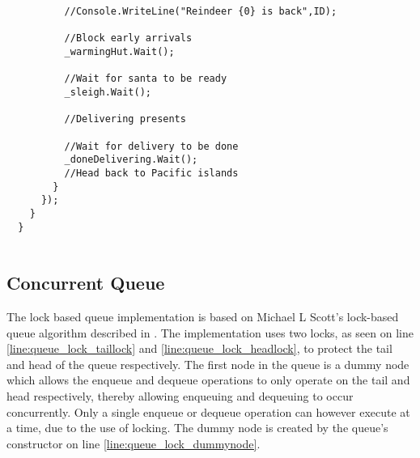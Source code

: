 \begin{lstlisting}
          //Console.WriteLine("Reindeer {0} is back",ID);

          //Block early arrivals
          _warmingHut.Wait();

          //Wait for santa to be ready
          _sleigh.Wait();

          //Delivering presents

          //Wait for delivery to be done
          _doneDelivering.Wait();
          //Head back to Pacific islands
        }
      });
    }
  }
  
\end{lstlisting}

\subsection{Concurrent Queue}
The lock based queue implementation is based on Michael L Scott's lock-based queue algorithm described in \cite{michael1996simple}. The implementation uses two locks, as seen on line \ref{line:queue_lock_taillock} and \ref{line:queue_lock_headlock}, to protect the tail and head of the queue respectively. The first node in the queue is a dummy node which allows the enqueue and dequeue operations to only operate on the tail and head respectively, thereby allowing enqueuing and dequeuing to occur concurrently. Only a single enqueue or dequeue operation can however execute at a time, due to the use of locking. The dummy node is created by the queue's constructor on line \ref{line:queue_lock_dummynode}.

